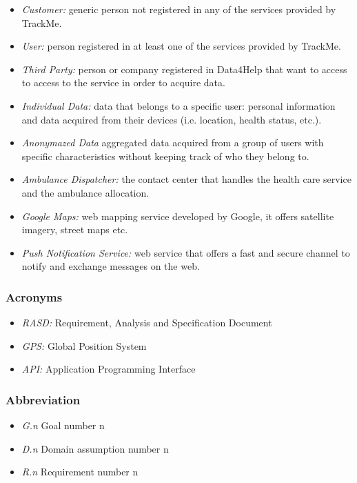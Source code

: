 \documentclass[a4paper]{article}
\begin{document}
    \begin{itemize}
        \item \textit{Customer:} generic person not registered in any of the services provided by TrackMe. 
        \item \textit{User:} person registered in at least one of the services provided by TrackMe.
        \item \textit{Third Party:} person or company registered in Data4Help that want to access to access to the service in order to acquire data.
        \item \textit{Individual Data:} data that belongs to a specific user: personal information and data acquired from their devices (i.e. location, health status, etc.).
        \item \textit{Anonymazed Data} aggregated data acquired from a group of users with specific characteristics without keeping track of who they belong to.
        \item \textit{Ambulance Dispatcher:} the contact center that handles the health care service and the ambulance allocation.
        \item \textit{Google Maps:} web mapping service developed by Google, it offers satellite imagery, street maps etc.
        \item \textit{Push Notification Service:} web service that offers a fast and secure channel to notify and exchange messages on the web.
    \end{itemize}
    
    \subsubsection{Acronyms}
    
    \begin{itemize}
        \item \textit{RASD:} Requirement, Analysis and Specification Document
        \item \textit{GPS:} Global Position System
        \item \textit{API:} Application Programming Interface
    \end{itemize}
    
    \subsubsection{Abbreviation}
        \begin{itemize}
        \item \textit{G.n} Goal number n
        \item \textit{D.n} Domain assumption number n
        \item \textit{R.n} Requirement number n
    \end{itemize}
\end{document}
